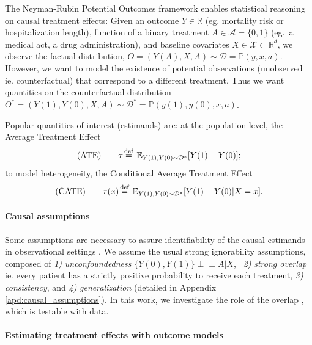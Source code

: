 \documentclass[10pt]{article}
\newcommand{\indep}{\perp \!\!\! \perp}
\newcommand\myeq{\stackrel{\mathclap{\text{def}}}{=}}
\begin{document}
\begin{multicols}{2}
    The Neyman-Rubin Potential Outcomes framework
    \cite{naimi2023defining,imbens_causal_2015} enables statistical
    reasoning on causal treatment effects: Given an outcome $Y \in \mathbb R$ (eg.
    mortality risk or hospitalization length), function of a binary treatment $A \in
        \mathcal{A} = \{0, 1\}$ (eg.~a medical act, a drug administration), and baseline
    covariates $X \in \mathcal{X} \subset \mathbb{R}^d$, we observe the factual
    distribution,
    $O = (Y(A), X, A) \sim \mathcal D = \mathbb P(y, x, a)$. However, we want to model the existence of potential observations
    (unobserved ie. counterfactual) that correspond to a different treatment. Thus we want
    quantities on the counterfactual distribution
    $O^{*} = (Y(1), Y(0), X, A) \sim \mathcal D^{*} = \mathbb P(y(1), y(0), x, a)$.

    Popular quantities of interest (estimands) are:
    at the population level, the
    Average Treatment Effect
    \begin{equation*}
        \text{(ATE)}\qquad
        \tau \myeq \; \mathbb{E}_{Y(1),Y(0) \sim \mathcal D^*}[Y(1) - Y(0)];
    \end{equation*}
    to model heterogeneity, the Conditional Average Treatment Effect
    \begin{equation*}
        \text{(CATE)}\qquad
        \tau (x) \myeq \; \mathbb{E}_{Y(1),Y(0) \sim \mathcal{D}^\star}[Y(1) - Y(0) | X=x].
    \end{equation*}

    \paragraph{Causal assumptions}

    Some assumptions are necessary to assure identifiability of the causal estimands
    in observational settings \cite{rubin_causal_2005}. We assume the usual
    strong ignorability assumptions, composed of \emph{1)}
    \emph{unconfoundedness} $\{Y(0),
        Y(1) \} \indep A | X$, \emph{~2)} \emph{strong overlap} ie. every patient has a
    strictly positive probability to receive each treatment, \emph{3)}
    \emph{consistency}, and \emph{4)} \emph{generalization} (detailed in Appendix
    \ref{apd:causal_assumptions}). In this work, we investigate the
    role of the overlap \cite{damour_overlap_2020}, which is testable with
    data.

    \paragraph{Estimating treatment effects with outcome models}\label{subsec:estimators}


\end{multicols}
\end{document}
